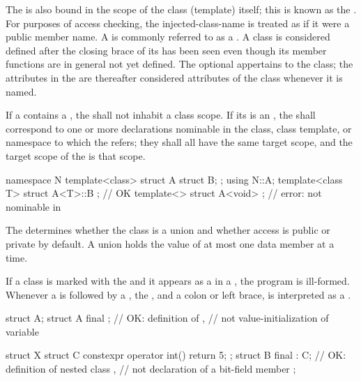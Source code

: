 \pnum
The
 is also bound in the scope of the class (template)
itself; this is known as the .
For purposes of access checking, the injected-class-name is treated as
if it were a public member name.
A  is commonly referred to as a .
A class is considered defined after the closing brace of its
 has been seen even though its member
functions are in general not yet defined.
The optional  appertains to the class; the attributes in
the  are thereafter considered attributes of the class
whenever it is named.

\pnum
If a  contains a ,
the  shall not inhabit a class scope.
If its  is an ,
the  shall correspond to
one or more declarations nominable in
the class, class template, or namespace to which the
 refers;
they shall all have the same target scope, and the target scope of the
 is that scope.
\begin{example}
\begin{codeblock}
namespace N {
  template<class>
  struct A {
    struct B;
  };
}
using N::A;
template<class T> struct A<T>::B {};    // OK
template<> struct A<void> {};           // error:  not nominable in \tcode{::}
\end{codeblock}
\end{example}

\pnum
\begin{note}
The  determines
whether the class is a union and
whether access is public or private by default.
A union holds the value of at most one data member at a time.
\end{note}

\pnum
If a class is marked with the   and it appears
as a  in a ,
the program is ill-formed. Whenever a
 is followed by a , the
 , and a colon or left brace,  is
interpreted as a .
\begin{example}
\begin{codeblock}
struct A;
struct A final {};      // OK: definition of ,
                        // not value-initialization of variable 

struct X {
 struct C { constexpr operator int() { return 5; } };
 struct B final : C{};  // OK: definition of nested class ,
                        // not declaration of a bit-field member 
};
\end{codeblock}
\end{example}

